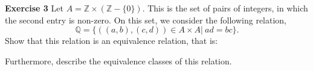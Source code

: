 \documentclass[12pt,oneside]{exam}
\newenvironment{exercise}[1]{\vspace{.1in}\noindent\textbf{Exercise #1 \hspace{.05em}}}{}
\begin{document}
\begin{exercise}{3}
Let $A = \mathbb{Z} \times (\mathbb{Z}-\{0\})$. This is the set of pairs of integers, in which the second entry is non-zero. On this set, we consider the following relation, 
\begin{equation*}
\mathbb{Q}=\{ ((a,b), (c,d)) \in A \times A| \ ad=bc\}.
\end{equation*}
Show that this relation is an equivalence relation, that is:
Furthermore, describe the equivalence classes of this relation. 
\end{exercise}
\end{document}
